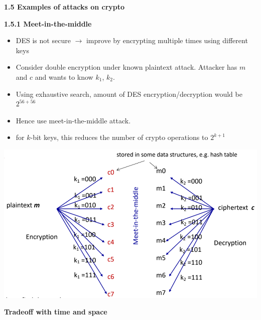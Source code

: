 \documentclass[landscape,a4paper]{extarticle}
\newenvironment{Figure}
  {\par\noindent\minipage{\linewidth}}
  {\endminipage\par\medskip}
\begin{document}
\begin{multicols*}{5}
    \textbf{1.5 Examples of attacks on crypto}

    \textbf{1.5.1 Meet-in-the-middle}

    \begin{itemize}
        \item DES is not secure $\rightarrow$ improve by encrypting multiple times using different
        keys
        \item Consider double encryption under known plaintext attack. Attacker has $m$ and $c$ and
        wants to know $k_1$, $k_2$.
        \item Using exhaustive search, amount of DES encryption/decryption would be $2^{56+56}$
        \item Hence use meet-in-the-middle attack.
        \item for $k$-bit keys, this reduces the number of crypto operations to $2^{k + 1}$
    \end{itemize}

    \begin{Figure}
        \centering
        \includegraphics[width=\linewidth]{meet_in_the_middle.png}        
    \end{Figure}

    \textbf{Tradeoff with time and space}


\end{multicols*}
\end{document}
